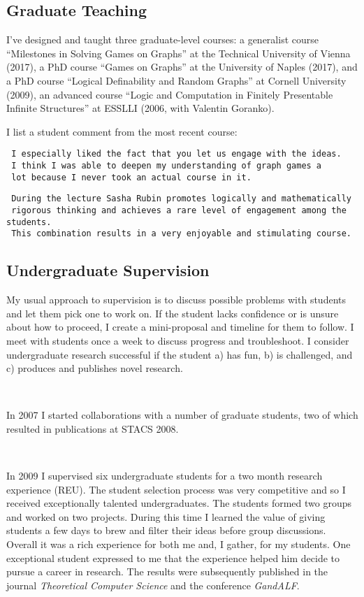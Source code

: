 \documentclass[10,a4paper,sans]{moderncv}
\begin{document}
\subsection{Graduate Teaching}

I've designed and taught three graduate-level courses: a generalist course ``Milestones in Solving Games on Graphs'' at the Technical University of Vienna (2017), a PhD course 
``Games on Graphs'' at the University of Naples (2017), and a PhD course ``Logical Definability and Random Graphs'' at Cornell University (2009), 
an advanced course ``Logic and Computation in Finitely Presentable Infinite Structures'' at ESSLLI (2006, with Valentin Goranko).

I list a student comment from the most recent course:
\begin{verbatim}
 I especially liked the fact that you let us engage with the ideas. 
 I think I was able to deepen my understanding of graph games a 
 lot because I never took an actual course in it.
\end{verbatim}

\begin{verbatim}
 During the lecture Sasha Rubin promotes logically and mathematically 
 rigorous thinking and achieves a rare level of engagement among the students. 
 This combination results in a very enjoyable and stimulating course.
\end{verbatim}

\subsection{Undergraduate Supervision}

My usual approach to supervision is to discuss possible problems with students and let them pick one to work on. 
If the student lacks confidence or is unsure about how to proceed, I create a mini-proposal and timeline for them to follow. I meet with students once a week to discuss progress and troubleshoot. I consider undergraduate research successful if the student a) has fun, b) is challenged, and c) produces and publishes novel research.

\

In 2007 I started collaborations with a number of graduate students, two of which resulted in publications at STACS 2008.

\

In 2009 I supervised six undergraduate students for a two month research experience (REU). The student selection process was very competitive and so I received exceptionally talented undergraduates. The students formed two groups and worked on two projects. During this time I learned the value of giving students a few days to brew and filter their ideas before group discussions. Overall it was a rich experience for both me and, I gather, for my students. One exceptional student expressed to me that the experience helped him decide to pursue a career in research. The results were subsequently published in the journal {\em Theoretical Computer Science} and the conference {\em GandALF}.
\end{document}
